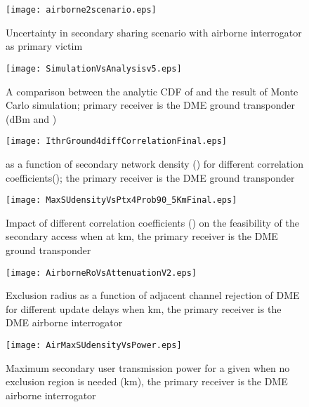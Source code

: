\documentclass[12pt,submission,journal,onecolumn]{IEEEtran}
\begin{document}
\begin{figure}[ht]
  \centering \texttt{[image: airborne2scenario.eps]}\\
  \centering \caption{Uncertainty in secondary sharing scenario with airborne interrogator as primary victim}
  \label{fig:AirborneScenario}
\end{figure}

\begin{figure}[h]
  \centering \texttt{[image: SimulationVsAnalysisv5.eps]}\\
  \centering \caption{A comparison between the analytic CDF of  and the result of Monte Carlo simulation; primary receiver is the DME ground transponder (dBm and )}
 \label{fig:SimulationVsAnalysis}
\end{figure}

\begin{figure}[h]
  \centering \texttt{[image: IthrGround4diffCorrelationFinal.eps]}\\
  \centering \caption{ as a function of secondary network density () for different correlation coefficients(); the primary receiver is the DME ground transponder}
  \label{fig:IthrDiffCorrelation}
\end{figure}

\begin{figure}[h]
 \centering \texttt{[image: MaxSUdensityVsPtx4Prob90\_5KmFinal.eps]}\\
  \centering \caption{Impact of different correlation coefficients () on the feasibility of the secondary access when  at km, the primary receiver is the DME ground transponder}
  \label{fig:MaxSUdensity}
\end{figure}
\begin{figure}[h]
  \centering \texttt{[image: AirborneRoVsAttenuationV2.eps]}\\
  \centering \caption{Exclusion radius as a function of adjacent channel rejection of DME for different update delays when km, the primary receiver is the DME airborne interrogator}
  \label{fig:AirborneRoVsDensity}
\end{figure}

\begin{figure}[h]
  \centering \texttt{[image: AirMaxSUdensityVsPower.eps]}\\
  \centering \caption{Maximum secondary user transmission power for a given  when no exclusion region is needed (km), the primary receiver is the DME airborne interrogator}
  \label{fig:AirPowerVsDensity}
\end{figure}
\end{document}
